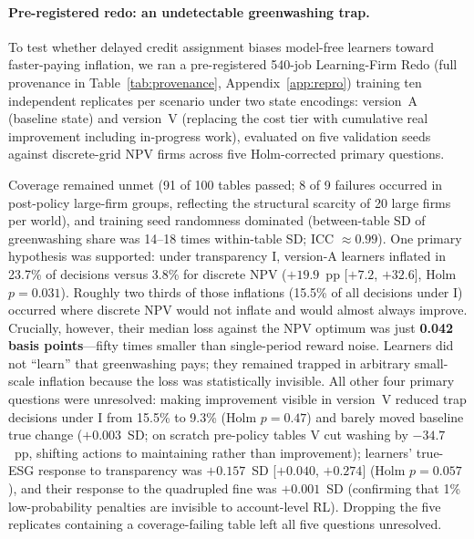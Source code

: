 \documentclass[11pt]{article}
\begin{document}
\paragraph{Pre-registered redo: an undetectable greenwashing trap.}
To test whether delayed credit assignment biases model-free learners toward faster-paying inflation, we ran a pre-registered 540-job Learning-Firm Redo (full provenance in Table~\ref{tab:provenance}, Appendix~\ref{app:repro}) training ten independent replicates per scenario under two state encodings: version~A (baseline state) and version~V (replacing the cost tier with cumulative real improvement including in-progress work), evaluated on five validation seeds against discrete-grid NPV firms across five Holm-corrected primary questions.

Coverage remained unmet (91 of 100 tables passed; 8 of 9 failures occurred in post-policy large-firm groups, reflecting the structural scarcity of 20 large firms per world), and training seed randomness dominated (between-table SD of greenwashing share was 14--18 times within-table SD; ICC $\approx 0.99$). One primary hypothesis was supported: under transparency I, version-A learners inflated in 23.7\% of decisions versus 3.8\% for discrete NPV ($+19.9$~pp [$+7.2$, $+32.6$], Holm $p = 0.031$). Roughly two thirds of those inflations (15.5\% of all decisions under I) occurred where discrete NPV would not inflate and would almost always improve. Crucially, however, their median loss against the NPV optimum was just \textbf{0.042 basis points}---fifty times smaller than single-period reward noise. Learners did not ``learn'' that greenwashing pays; they remained trapped in arbitrary small-scale inflation because the loss was statistically invisible. All other four primary questions were unresolved: making improvement visible in version~V reduced trap decisions under I from 15.5\% to 9.3\% (Holm $p = 0.47$) and barely moved baseline true change ($+0.003$~SD; on scratch pre-policy tables V cut washing by $-34.7$~pp, shifting actions to maintaining rather than improvement); learners' true-ESG response to transparency was $+0.157$~SD [$+0.040$, $+0.274$] (Holm $p = 0.057$), and their response to the quadrupled fine was $+0.001$~SD (confirming that 1\% low-probability penalties are invisible to account-level RL). Dropping the five replicates containing a coverage-failing table left all five questions unresolved.
\end{document}
